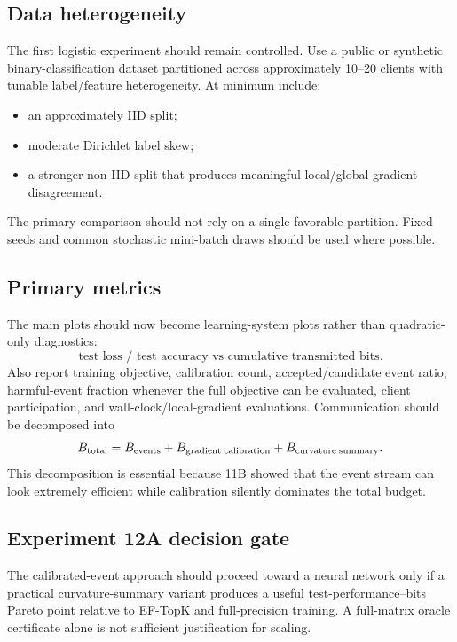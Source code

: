 \subsection{Data heterogeneity}

The first logistic experiment should remain controlled. Use a public or synthetic binary-classification dataset partitioned across approximately 10--20 clients with tunable label/feature heterogeneity. At minimum include:
\begin{itemize}
  \item an approximately IID split;
  \item moderate Dirichlet label skew;
  \item a stronger non-IID split that produces meaningful local/global gradient disagreement.
\end{itemize}
The primary comparison should not rely on a single favorable partition. Fixed seeds and common stochastic mini-batch draws should be used where possible.

\subsection{Primary metrics}

The main plots should now become learning-system plots rather than quadratic-only diagnostics:
\begin{equation}
  \boxed{\text{test loss / test accuracy vs cumulative transmitted bits}.}
\end{equation}
Also report training objective, calibration count, accepted/candidate event ratio, harmful-event fraction whenever the full objective can be evaluated, client participation, and wall-clock/local-gradient evaluations. Communication should be decomposed into
\begin{equation}
  B_{\rm total}
  =
  B_{\rm events}
  +B_{\rm gradient\;calibration}
  +B_{\rm curvature\;summary}.
\end{equation}
This decomposition is essential because 11B showed that the event stream can look extremely efficient while calibration silently dominates the total budget.

\subsection{Experiment 12A decision gate}

The calibrated-event approach should proceed toward a neural network only if a practical curvature-summary variant produces a useful test-performance--bits Pareto point relative to EF-TopK and full-precision training. A full-matrix oracle certificate alone is not sufficient justification for scaling.

